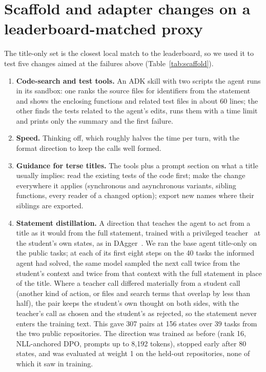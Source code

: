 \documentclass[11pt]{article}
\begin{document}
\section{Scaffold and adapter changes on a leaderboard-matched proxy}\label{sec:scaffold}

The title-only set is the closest local match to the leaderboard, so we used it to test five changes aimed at the failures above (Table~\ref{tab:scaffold}).

\begin{enumerate}
  \item \textbf{Code-search and test tools.} An ADK skill with two scripts the agent runs in its sandbox: one ranks the source files for identifiers from the statement and shows the enclosing functions and related test files in about 60 lines; the other finds the tests related to the agent's edits, runs them with a time limit and prints only the summary and the first failure.
  \item \textbf{Speed.} Thinking off, which roughly halves the time per turn, with the format direction to keep the calls well formed.
  \item \textbf{Guidance for terse titles.} The tools plus a prompt section on what a title usually implies: read the existing tests of the code first; make the change everywhere it applies (synchronous and asynchronous variants, sibling functions, every reader of a changed option); export new names where their siblings are exported.
  \item \textbf{Statement distillation.} A direction that teaches the agent to act from a title as it would from the full statement, trained with a privileged teacher~\citep{chen2020cheating} at the student's own states, as in DAgger~\citep{ross2011dagger}. We ran the base agent title-only on the public tasks; at each of its first eight steps on the 40 tasks the informed agent had solved, the same model sampled the next call twice from the student's context and twice from that context with the full statement in place of the title. Where a teacher call differed materially from a student call (another kind of action, or files and search terms that overlap by less than half), the pair keeps the student's own thought on both sides, with the teacher's call as chosen and the student's as rejected, so the statement never enters the training text. This gave 307 pairs at 156 states over 39 tasks from the two public repositories. The direction was trained as before (rank 16, NLL-anchored DPO, prompts up to 8,192 tokens), stopped early after 80 states, and was evaluated at weight 1 on the held-out repositories, none of which it saw in training.

\end{enumerate}
\end{document}
